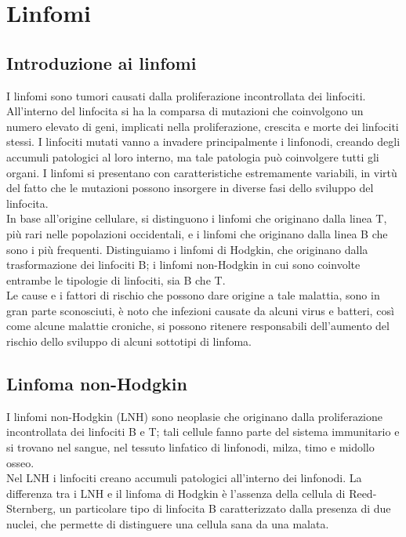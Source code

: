 \chapter{Linfomi}

\section{Introduzione ai linfomi}
I linfomi sono tumori causati dalla proliferazione incontrollata dei linfociti.
All’interno del linfocita si ha la comparsa di mutazioni che coinvolgono un numero elevato di geni, 
implicati nella proliferazione, crescita e morte dei linfociti stessi.
I linfociti mutati vanno a invadere principalmente i linfonodi, creando degli accumuli patologici al loro interno, 
ma tale patologia può coinvolgere tutti gli organi.  
I linfomi si presentano con caratteristiche estremamente variabili, in virtù del fatto che le mutazioni 
possono insorgere in diverse fasi dello sviluppo del linfocita\cite{LINFOMIAIL}.\\

In base all’origine cellulare, si distinguono i linfomi che originano dalla linea T, 
più rari nelle popolazioni occidentali, e i linfomi che originano dalla linea B che sono i più frequenti. 
Distinguiamo i linfomi di Hodgkin, che originano dalla trasformazione dei linfociti B; 
i linfomi non-Hodgkin in cui sono coinvolte entrambe le tipologie di linfociti, sia B che T.\\

Le cause e i fattori di rischio che possono dare origine a tale malattia, sono in gran parte sconosciuti, 
è noto che infezioni causate da alcuni virus e batteri, così come alcune malattie croniche, 
si possono ritenere responsabili dell’aumento del rischio dello sviluppo di alcuni sottotipi di linfoma\cite{LINFOMIAIL}.\\

\section{Linfoma non-Hodgkin}
I linfomi non-Hodgkin (LNH) sono neoplasie che originano dalla proliferazione incontrollata dei linfociti B e T; 
tali cellule fanno parte del sistema immunitario e si trovano nel sangue, nel tessuto linfatico di linfonodi, milza, 
timo e midollo osseo\cite{LNHAIL}.\\ 
Nel LNH i linfociti creano accumuli patologici all’interno dei linfonodi. La differenza tra i LNH e il 
linfoma di Hodgkin è l’assenza della cellula di Reed-Sternberg, un particolare tipo di linfocita B caratterizzato 
dalla presenza di due nuclei, che permette di distinguere una cellula sana da una malata\cite{LNHAIMAC}.\\

